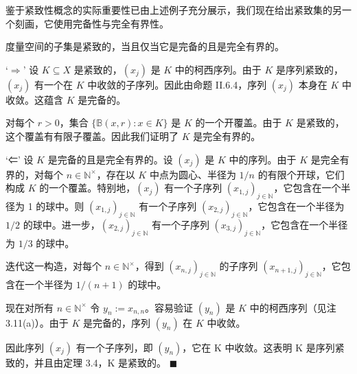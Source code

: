 鉴于紧致性概念的实际重要性已由上述例子充分展示，我们现在给出紧致集的另一个刻画，它使用完备性与完全有界性。

\begin{theorem}

度量空间的子集是紧致的，当且仅当它是完备的且是完全有界的。

\proofhead
‘$\Rightarrow$’ 设 $ K \subseteq X $ 是紧致的，$ (x_j) $ 是 $ K $ 中的柯西序列。由于 $ K $ 是序列紧致的，$ (x_j) $ 有一个在 $ K $ 中收敛的子序列。因此由命题 II.6.4，序列 $ (x_j) $ 本身在 $ K $ 中收敛。这蕴含 $ K $ 是完备的。

对每个 $ r > 0 $，集合 $ \{\mathbb{B}(x, r) : x \in K\} $ 是 $ K $ 的一个开覆盖。由于 $ K $ 是紧致的，这个覆盖有有限子覆盖。因此我们证明了 $ K $ 是完全有界的。

‘⇐’ 设 $K$ 是完备的且是完全有界的。设 $(x_j)$ 是 $K$ 中的序列。由于 $K$ 是完全有界的，对每个 $n \in \mathbb{N}^\times$，存在以 $K$ 中点为圆心、半径为 $1/n$ 的有限个开球，它们构成 $K$ 的一个覆盖。特别地，$(x_j)$ 有一个子序列 $(x_{1,j})_{j \in \mathbb{N}}$，它包含在一个半径为 1 的球中。则 $(x_{1,j})_{j \in \mathbb{N}}$ 有一个子序列 $(x_{2,j})_{j \in \mathbb{N}}$，它包含在一个半径为 $1/2$ 的球中。进一步，$(x_{2,j})_{j \in \mathbb{N}}$ 有一个子序列 $(x_{3,j})_{j \in \mathbb{N}}$，它包含在一个半径为 $1/3$ 的球中。

迭代这一构造，对每个 $ n \in \mathbb{N}^\times $，得到 $ (x_{n,j})_{j \in \mathbb{N}} $ 的子序列 $ (x_{n+1,j})_{j \in \mathbb{N}} $，它包含在一个半径为 $ 1/(n+1) $ 的球中。

现在对所有 $ n \in \mathbb{N}^\times $ 令 $ y_n := x_{n,n} $。容易验证 $ (y_n) $ 是 $ K $ 中的柯西序列（见注 3.11(a)）。由于 $ K $ 是完备的，序列 $ (y_n) $ 在 $ K $ 中收敛。

因此序列 $ (x_{j}) $ 有一个子序列，即 $ (y_{n}) $，它在 K 中收敛。这表明 K 是序列紧致的，并且由定理 3.4，K 是紧致的。 $ \blacksquare $
\end{theorem}

